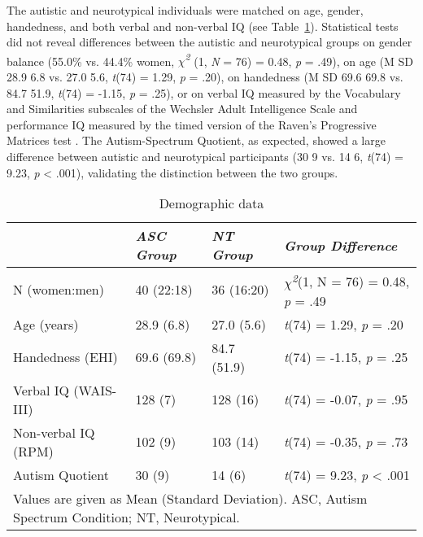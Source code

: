 The autistic and neurotypical individuals were matched on age, gender, handedness, and both verbal and non-verbal IQ (see Table~\ref{tab:ppt-stats-lang}). Statistical tests did not reveal differences between the autistic and neurotypical groups on gender balance (55.0\% vs. 44.4\% women, \textit{$\chi$\textsuperscript{2}} (1, \textit{N} = 76) = 0.48, \textit{p} = .49), on age (M \textpm{} SD 28.9 \textpm{} 6.8 vs. 27.0 \textpm{} 5.6, \textit{t}(74) = 1.29, \textit{p} = .20), on handedness (M \textpm{} SD 69.6 \textpm{} 69.8 vs. 84.7 \textpm{} 51.9, \textit{t}(74) = -1.15, \textit{p} = .25), or on verbal IQ measured by the Vocabulary and Similarities subscales of the Wechsler Adult Intelligence Scale \citep[128 \textpm{} 7 vs. 128 \textpm{} 16, \textit{t}(74) = -0.07, \textit{p} = .95]{wechsler1997} and performance IQ measured by the timed version of the Raven's Progressive Matrices test \citep[102 \textpm{} 9 vs. 103 \textpm{} 14, \textit{t}(74) = -0.35, \textit{p} = .73]{raven1989}. The Autism-Spectrum Quotient, as expected, showed a large difference between autistic and neurotypical participants (30 \textpm{} 9 vs. 14 \textpm{} 6, \textit{t}(74) = 9.23, \textit{p} <  .001), validating the distinction between the two groups.

\begin{table}[ht]
    \captionsetup{justification=raggedright, singlelinecheck=false, font = normal} %
    \setlength{\tabcolsep}{12pt} %
    \renewcommand{\arraystretch}{1.5} %
    \caption{Demographic data}
    \label{tab:ppt-stats-lang}
    \begin{tabular}{llll}
    \hline
    \textbf{} & \textit{ASC Group} & \textit{NT Group} & \textit{Group Difference} \\
    \hline
    N (women:men) & 40 (22:18) & 36 (16:20) & \textit{$\chi$\textsuperscript{2}}(1, N = 76) = 0.48, \textit{p} = .49 \\
    Age (years) & 28.9 (6.8) & 27.0 (5.6) & \textit{t}(74) = 1.29, \textit{p} = .20 \\
    Handedness (EHI) & 69.6 (69.8) & 84.7 (51.9) & \textit{t}(74) = -1.15, \textit{p} = .25 \\
    Verbal IQ (WAIS-III) & 128 (7) & 128 (16) & \textit{t}(74) = -0.07, \textit{p} = .95 \\
    Non-verbal IQ (RPM) & 102 (9) & 103 (14) & \textit{t}(74) = -0.35, \textit{p} = .73 \\
    Autism Quotient & 30 (9) & 14 (6) & \textit{t}(74) = 9.23, \textit{p} < .001 \\
    \hline
    \multicolumn{4}{l}{\small{Values are given as Mean (Standard Deviation). ASC, Autism Spectrum Condition; NT, Neurotypical.}} \\
    \end{tabular}
\end{table}

